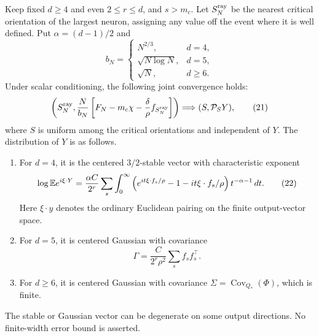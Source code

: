 \begin{theorem}
Keep fixed $d\ge4$ and even $2\le r\le d$, and $s>m_c$.
Let $S_N^{\rm ray}$ be the nearest critical orientation of the largest
neuron, assigning any value off the event where it is well defined.
Put $\alpha=(d-1)/2$ and
\[
 b_N=\begin{cases}
 N^{2/3},&d=4,\\
 \sqrt{N\log N},&d=5,\\
 \sqrt N,&d\ge6.
 \end{cases}
\]
Under scalar conditioning, the following joint convergence holds:
\[
 \left(S_N^{\rm ray},\frac N{b_N}
    \left[F_N-m_c\chi-\frac\delta\rho f_{S_N^{\rm ray}}\right]\right)
       \Longrightarrow (S,\mathcal P_S Y),                \tag{21}
\]
where $S$ is uniform among the critical orientations and independent
of $Y$. The distribution of $Y$ is as follows.
\begin{enumerate}
\item For $d=4$, it is the centered $3/2$-stable vector with
characteristic exponent
\[
 \log\mathbb E e^{i\xi\cdot Y}
 =\frac{\alpha C}{2^r}\sum_s\int_0^\infty
  \left(e^{it\xi\cdot f_s/\rho}-1-it\xi\cdot f_s/\rho\right)
                           t^{-\alpha-1}\,dt.            \tag{22}
\]
Here $\xi\cdot y$ denotes the ordinary Euclidean pairing on the
finite output-vector space.
\item For $d=5$, it is centered Gaussian with covariance
\[
                 \Gamma=\frac{C}{2^r\rho^2}
                                   \sum_s f_sf_s^\top.   \tag{23}
\]
\item For $d\ge6$, it is centered Gaussian with covariance
$\Sigma=\operatorname{Cov}_{Q_*}(\Phi)$, which is finite.
\end{enumerate}
The stable or Gaussian vector can be degenerate on some output
directions. No finite-width error bound is asserted.
\end{theorem}
